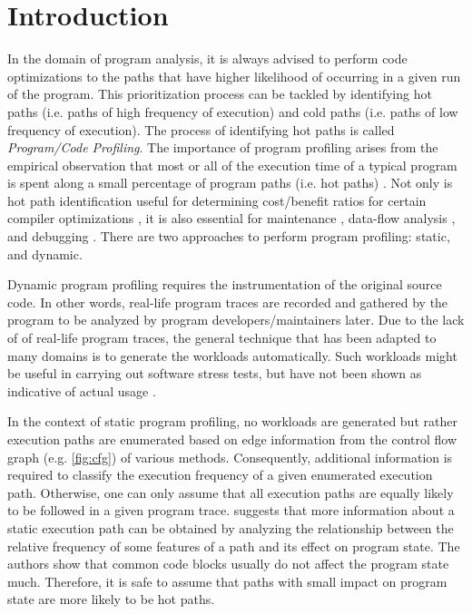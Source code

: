 \documentclass[10pt,twocolumn,letterpaper]{article}
\begin{document}
\section{Introduction}
\label{sec:intro}
In the domain of program analysis, it is always advised to perform code optimizations to the paths that have higher likelihood of occurring in a given run of
the program. This prioritization process can be tackled by identifying hot paths (i.e. paths of high frequency of execution) and cold paths (i.e. paths of low
frequency of execution). The process of identifying hot paths is called \textit{Program/Code Profiling}. The importance of program profiling arises from the
empirical observation that most or all of the execution time of a typical program is spent along a small percentage of program paths (i.e. hot paths)
\cite{buse2009road}. Not only is hot path identification useful for determining cost/benefit ratios for certain compiler optimizations \cite{boogerd2008use}, it
is also essential for maintenance \cite{reps1997use}, data-flow analysis \cite{ammons1998improving}, and debugging \cite{chilimbi2009holmes}. There are two
approaches to perform program profiling: static, and dynamic.

Dynamic program profiling requires the instrumentation of the original source code. In other words, real-life program traces are recorded and gathered by
the program to be analyzed by program developers/maintainers later. Due to the lack of of real-life program traces, the general technique that has been adapted
to many domains \cite{krishnamurthy2006synthetic, van2008generating, casale2010automatically, sen2007concolic, sen2006cute} is to generate the workloads
automatically. Such workloads might be useful in carrying out software stress tests, but have not been shown as indicative of actual usage \cite{buse2009road}.

In the context of static program profiling, no workloads are generated but rather execution paths are enumerated based on edge information from the
control flow graph (e.g. \ref{fig:cfg}) of various methods. Consequently, additional information is required to classify the execution frequency of a given
enumerated execution path. Otherwise, one can only assume that all execution paths are equally likely to be followed in a given program trace.
\cite{buse2009road} suggests that more information about a static execution path can be obtained by analyzing the relationship between the relative frequency of
some features of a path and its effect on program state. The authors show that common code blocks usually do not affect the program state much. Therefore, it
is safe to assume that paths with small impact on program state are more likely to be hot paths.
\end{document}
